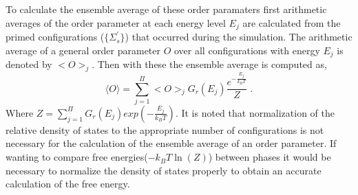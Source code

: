 \documentclass[aps,prl,reprint,superscriptaddress,showkeys]{revtex4-1}
\begin{document}
To calculate the ensemble average of these order paramaters first arithmetic averages of the order parameter at each energy level $E_j$ are calculated from the primed configurations ($\{\Sigma_s ^{'}\}$) that occurred during the simulation. The arithmetic average of a general order parameter $O$ over all configurations with energy $E_j$ is denoted by $< O >_j$. Then with these the ensemble average is computed as, 
  \begin{equation}
  \langle O \rangle  =  \sum_{j=1}^{\Pi}< O >_j G_r(E_j) \frac{e^{-\frac{E_j}{k_BT}}}{Z} \;.
  \label{ensembleaverage}
  \end{equation}
  Where $Z= \sum_{j=1}^{\Pi} G_r(E_j) exp(-\frac{E_j}{k_BT})$. 
It is noted that normalization of the relative density of states to the appropriate number of configurations is not necessary for the calculation of the ensemble average of an order parameter. If wanting to compare free energies($-k_BT\ln(Z)$) between phases it would be necessary to normalize the density of states properly to obtain an accurate calculation of the free energy. 
\end{document}
